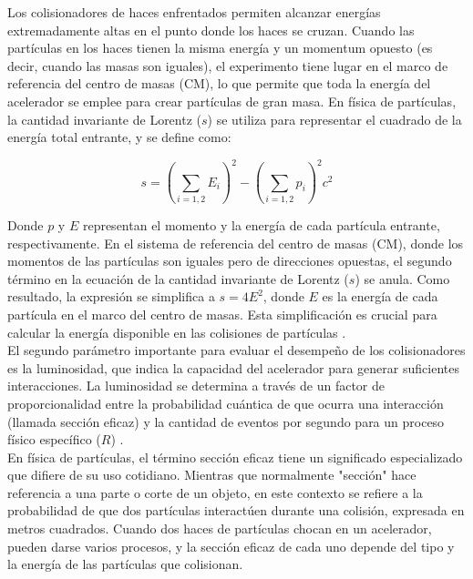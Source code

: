 Los colisionadores de haces enfrentados permiten alcanzar energías extremadamente altas en el punto donde los haces se cruzan. Cuando las partículas en los haces tienen la misma energía y un momentum opuesto (es decir, cuando las masas son iguales), el experimento tiene lugar en el marco de referencia del centro de masas (CM), lo que permite que toda la energía del acelerador se emplee para crear partículas de gran masa. En física de partículas, la cantidad invariante de Lorentz ($s$) se utiliza para representar el cuadrado de la energía total entrante, y se define como:

\begin{equation}
s = \left ( \sum_{i = 1,2}^{}E_{i} \right )^{2}-\left ( \sum_{i = 1,2}^{}p_{i} \right )^{2}c^{2}
\end{equation}

Donde \( p \) y \( E \) representan el momento y la energía de cada partícula entrante, respectivamente. En el sistema de referencia del centro de masas (CM), donde los momentos de las partículas son iguales pero de direcciones opuestas, el segundo término en la ecuación de la cantidad invariante de Lorentz (\( s \)) se anula. Como resultado, la expresión se simplifica a \( s = 4E^2 \), donde \( E \) es la energía de cada partícula en el marco del centro de masas. Esta simplificación es crucial para calcular la energía disponible en las colisiones de partículas \cite{undergraduate_accelerators_chapter}.\\

El segundo parámetro importante para evaluar el desempeño de los colisionadores es la luminosidad, que indica la capacidad del acelerador para generar suficientes interacciones. La luminosidad se determina a través de un factor de proporcionalidad entre la probabilidad cuántica de que ocurra una interacción (llamada sección eficaz) y la cantidad de eventos por segundo para un proceso físico específico ($R$) \cite{ref_lib_vol3}.\\

En física de partículas, el término sección eficaz tiene un significado especializado que difiere de su uso cotidiano. Mientras que normalmente "sección" hace referencia a una parte o corte de un objeto, en este contexto se refiere a la probabilidad de que dos partículas interactúen durante una colisión, expresada en metros cuadrados. Cuando dos haces de partículas chocan en un acelerador, pueden darse varios procesos, y la sección eficaz de cada uno depende del tipo y la energía de las partículas que colisionan.\\

